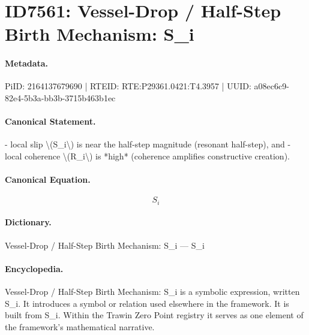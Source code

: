 \section*{ID7561: Vessel-Drop / Half-Step Birth Mechanism: S\_i}
\paragraph{Metadata.}
PiID: 2164137679690 | RTEID: RTE:P29361.0421:T4.3957 | UUID: a08ec6c9-82e4-5b3a-bb3b-3715b463b1ec

\paragraph{Canonical Statement.}
- local slip \textbackslash{}(S\_i\textbackslash{}) is near the half-step magnitude (resonant half-step), and - local coherence \textbackslash{}(R\_i\textbackslash{}) is *high* (coherence amplifies constructive creation).

\paragraph{Canonical Equation.}
\[
S_i
\]

\paragraph{Dictionary.}
Vessel-Drop / Half-Step Birth Mechanism: S\_i — S\_i

\paragraph{Encyclopedia.}
Vessel-Drop / Half-Step Birth Mechanism: S\_i is a symbolic expression, written S\_i. It introduces a symbol or relation used elsewhere in the framework. It is built from S\_i. Within the Trawin Zero Point registry it serves as one element of the framework's mathematical narrative.
